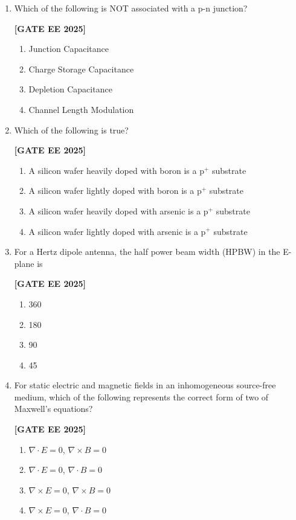 \documentclass[12pt]{article}
\begin{document}
\begin{enumerate}[leftmargin=2.5em, label=\textbf{Q.\arabic*}., itemsep=2em]
\item
Which of the following is NOT associated with a p-n junction?
 
\noindent \textbf{[GATE EE 2025]}
\begin{multicols}{2}
\begin{enumerate}
  \item Junction Capacitance
  \item Charge Storage Capacitance
  \item Depletion Capacitance
  \item Channel Length Modulation
\end{enumerate}
\end{multicols}

\item
Which of the following is true?
 
\noindent \textbf{[GATE EE 2025]}
\begin{enumerate}
  \item A silicon wafer heavily doped with boron is a p$^+$ substrate
  \item A silicon wafer lightly doped with boron is a p$^+$ substrate
  \item A silicon wafer heavily doped with arsenic is a p$^+$ substrate
  \item A silicon wafer lightly doped with arsenic is a p$^+$ substrate
\end{enumerate}

\item
For a Hertz dipole antenna, the half power beam width (HPBW) in the E-plane is
 
\noindent \textbf{[GATE EE 2025]}
\begin{multicols}{4}
\begin{enumerate}
  \item 360\degree
  \item 180\degree
  \item 90\degree
  \item 45\degree
\end{enumerate}
\end{multicols}

\item
For static electric and magnetic fields in an inhomogeneous source-free medium, which of the following represents the correct form of two of Maxwell's equations?

\noindent \textbf{[GATE EE 2025]}
\begin{multicols}{2}
\begin{enumerate}
  \item $\nabla \cdot E = 0$, \quad $\nabla \times B = 0$
  \item $\nabla \cdot E = 0$, \quad $\nabla \cdot B = 0$
  \item $\nabla \times E = 0$, \quad $\nabla \times B = 0$
  \item $\nabla \times E = 0$, \quad $\nabla \cdot B = 0$
\end{enumerate}
\end{multicols}



\end{enumerate}
\end{document}

